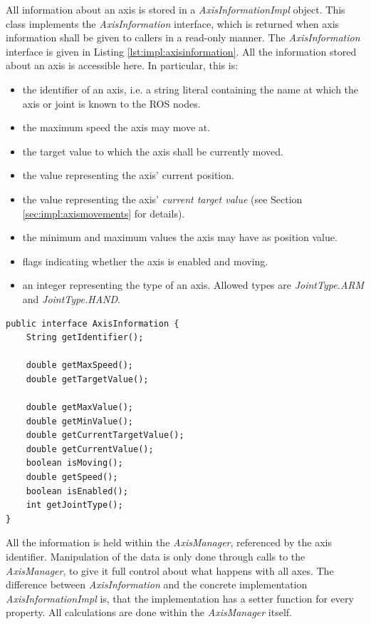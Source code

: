 All information about an axis is stored in a \textit{AxisInformationImpl} object. This class implements the \textit{AxisInformation} interface, which is returned when axis information shall be given to callers in a read-only manner. The \textit{AxisInformation} interface is given in Listing \ref{lst:impl:axisinformation}. All the information stored about an axis is accessible here. In particular, this is: 
\begin{itemize}
	\item the identifier of an axis, i.e. a string literal containing the name at which the axis or joint is known to the ROS nodes.
	\item the maximum speed the axis may move at.
	\item the target value to which the axis shall be currently moved.
	\item the value representing the axis' current position.
	\item the value representing the axis' \textit{current target value} (see Section \ref{sec:impl:axismovements} for details).
	\item the minimum and maximum values the axis may have as position value.
	\item flags indicating whether the axis is enabled and moving.
	\item an integer representing the type of an axis. Allowed types are \textit{JointType.ARM} and \textit{JointType.HAND}.
\end{itemize}

\begin{lstlisting}[caption={The AxisInformation interface}, label=lst:impl:axisinformation]
public interface AxisInformation {
	String getIdentifier();
	
	double getMaxSpeed();
	double getTargetValue();
	
	double getMaxValue();
	double getMinValue();
	double getCurrentTargetValue();
	double getCurrentValue();
	boolean isMoving();
	double getSpeed();
	boolean isEnabled();
	int getJointType();
}
\end{lstlisting}

All the information is held within the \textit{AxisManager}, referenced by the axis identifier. Manipulation of the data is only done through calls to the \textit{AxisManager}, to give it full control about what happens with all axes. The difference between \textit{AxisInformation} and the concrete implementation \textit{AxisInformationImpl} is, that the implementation has a setter function for every property. All calculations are done within the \textit{AxisManager} itself.

